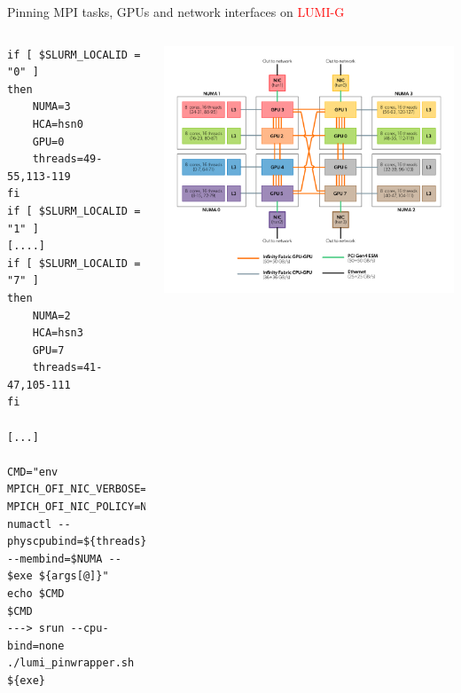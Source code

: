 \documentclass[xcolor={dvipsnames,table}]{beamer}
\begin{document}
\begin{frame}[fragile]{Pinning MPI tasks, GPUs and network interfaces on \textcolor{red}{LUMI-G}}
  \vspace{-0.4cm}
  \begin{columns}
    \small
    \vspace{-0.6cm}
  \begin{verbatim}
if [ $SLURM_LOCALID = "0" ]
then
    NUMA=3
    HCA=hsn0
    GPU=0
    threads=49-55,113-119
fi
if [ $SLURM_LOCALID = "1" ]
[....]
if [ $SLURM_LOCALID = "7" ]
then
    NUMA=2
    HCA=hsn3
    GPU=7
    threads=41-47,105-111
fi

[...]

CMD="env MPICH_OFI_NIC_VERBOSE=2 MPICH_OFI_NIC_POLICY=NUMA
numactl --physcpubind=${threads} --membind=$NUMA -- $exe ${args[@]}"
echo $CMD
$CMD
---> srun --cpu-bind=none ./lumi_pinwrapper.sh ${exe}
  \end{verbatim}
      \includegraphics[width=\textwidth]{lumig-node-architecture}
      \vspace{2.5cm}
  \end{columns}
\end{frame}
\end{document}
